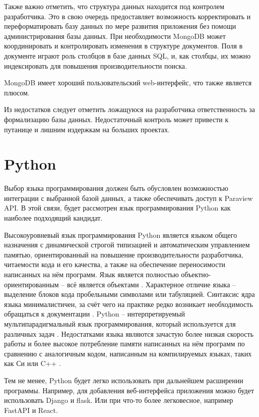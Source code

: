 \documentclass[14pt]{extreport}
\begin{document}
Также важно отметить, что структура данных находится под контролем разработчика. Это в свою очередь предоставляет возможность корректировать и переформатировать базу данных по мере развития приложения без помощи администрирования базы данных. При необходимости MongoDB может координировать и контролировать изменения в структуре документов. Поля в документе играют роль столбцов в базе данных SQL, и, как столбцы, их можно индексировать для повышения производительности поиска.

MongoDB имеет хороший пользовательский web-интерфейс, что также является плюсом.

Из недостатков следует отметить ложащуюся на разработчика ответственность за формализацию базы данных. Недостаточный контроль может привести к путанице и лишним издержкам на больших проектах.

\section{Python}
Выбор языка программирования должен быть обусловлен возможностью интеграции с выбранной базой данных, а также обеспечивать доступ к Paraview API. В этой связи, будет рассмотрен язык программирования Python как наиболее подходящий кандидат.

Высокоуровневый язык программирования Python является языком общего назначения с динамической строгой типизацией и автоматическим управлением памятью, ориентированный на повышение производительности разработчика, читаемости кода и его качества, а также на обеспечение переносимости написанных на нём программ. Язык является полностью объектно-ориентированным -- всё является объектами \cite{PythonYogesh}. 
Характерное отличие языка -- выделение блоков кода пробельными символами или табуляцией. Синтаксис ядра языка минималистичен, за счёт чего на практике редко возникает необходимость обращаться к документации \cite{PythonLutz}. Python -- интерпретируемый мультипарадигмальный язык программирования, который используется для различных задач \cite{PythonYogesh}. Недостатками языка являются зачастую более низкая скорость работы и более высокое потребление памяти написанных на нём программ по сравнению с аналогичным кодом, написанным на компилируемых языках, таких как Си или C++ \cite{PythonLutz}. 

Тем не менее, Python будет легко использовать при дальнейшем расширении программы. Например, для добавления веб-интерфейса приложения можно будет использовать Django и flask. Или при что-то более легковесное, например FastAPI и React.
\end{document}

